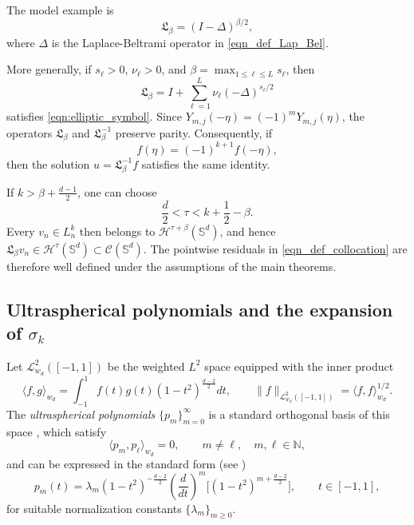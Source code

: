 \documentclass{article}
\numberwithin{equation}{section}
\def\sul{\sum\limits}
\begin{document}
The model example is
\begin{equation*}
\mathfrak L_\beta=(I-\Delta)^{\beta/2},
\end{equation*}
where $\Delta$ is the Laplace-Beltrami operator in \eqref{eqn_def_Lap_Bel}.

More generally, if $s_\ell>0$, $\nu_\ell>0$, and $\beta=\max_{1\leq\ell\leq L}s_\ell$, then
\begin{equation*}
\mathfrak L_\beta=I+\sul_{\ell=1}^L\nu_\ell(-\Delta)^{s_\ell/2}
\end{equation*}
satisfies \eqref{eqn:elliptic_symbol}. Since $Y_{m,j}(-\eta)=(-1)^mY_{m,j}(\eta)$, the operators $\mathfrak L_\beta$ and $\mathfrak L_\beta^{-1}$ preserve parity. Consequently, if
\begin{equation*}
f(\eta)=(-1)^{k+1}f(-\eta),
\end{equation*}
then the solution $u=\mathfrak L_\beta^{-1}f$ satisfies the same identity.

If $k>\beta+\frac{d-1}{2}$, one can choose
\begin{equation*}
\frac d2<\tau<k+\frac12-\beta.
\end{equation*}
Every $v_n\in L_n^k$ then belongs to $\mathcal H^{\tau+\beta}(\mathbb S^d)$, and hence $\mathfrak L_\beta v_n\in\mathcal H^\tau(\mathbb S^d)\subset\mathcal C(\mathbb S^d)$. The pointwise residuals in \eqref{eqn_def_collocation} are therefore well defined under the assumptions of the main theorems.


\medskip

\subsection{Ultraspherical polynomials and the expansion of $\sigma_k$}

Let $\mathcal{L}^2_{w_d}([-1,1])$ be the weighted $L^2$ space equipped with the inner product
\[
    \langle f,g\rangle_{w_d}
    = \int_{-1}^1 f(t)g(t)(1-t^2)^{\frac{d-2}{2}}dt,
    \qquad
    \|f\|_{\mathcal{L}^2_{w_d}([-1,1])}
    = \langle f,f\rangle_{w_d}^{1/2}.
\]
The \emph{ultraspherical polynomials} $\{p_m\}_{m=0}^\infty$ is a standard orthogonal basis of this space
, which satisfy
\begin{equation}\label{eqn:def_ultraspherical}
    \langle p_m, p_\ell\rangle_{w_d} = 0,
    \qquad m \ne \ell, \quad m,\ell \in \mathbb{N},
\end{equation}
and can be expressed in the standard form (see \cite{szego1975orthogonal})
\begin{equation}\label{eqn:lambdam_pm}
    p_m(t)
    = \lambda_m(1-t^2)^{-\frac{d-2}{2}}
      \left(\frac{d}{dt}\right)^m
      \!\big[(1-t^2)^{m+\frac{d-2}{2}}\big],
      \qquad t \in [-1,1],
\end{equation}
for suitable normalization constants $\{\lambda_m\}_{m\ge0}$.
\end{document}
